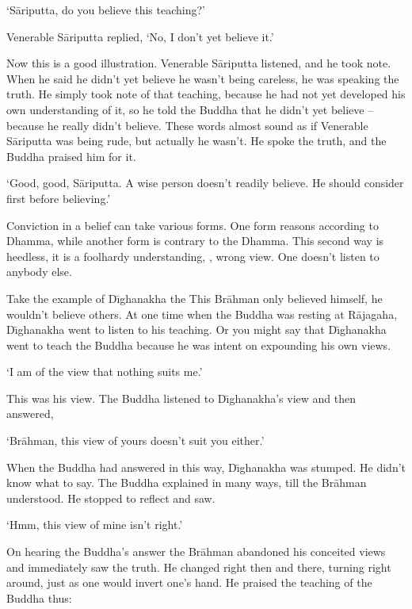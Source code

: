 `S\=ariputta, do you believe this teaching?' 

Venerable S\=ariputta replied, `No, I don't yet believe it.' 

Now this is a good illustration. Venerable S\=ariputta listened, and he took note. When he said he didn't yet believe he wasn't being careless, he was speaking the truth. He simply took note of that teaching, because he had not yet developed his own understanding of it, so he told the Buddha that he didn't yet believe -- because he really didn't believe. These words almost sound as if Venerable S\=ariputta was being rude, but actually he wasn't. He spoke the truth, and the Buddha praised him for it. 

`Good, good, S\=ariputta. A wise person doesn't readily believe. He should consider first before believing.' 

Conviction in a belief can take various forms. One form reasons according to Dhamma, while another form is contrary to the Dhamma. This second way is heedless, it is a foolhardy understanding, , wrong view. One doesn't listen to anybody else. 

Take the example of D\={\i}ghanakha the  This Br\=ahman only believed himself, he wouldn't believe others. At one time when the Buddha was resting at R\=ajagaha, D\={\i}ghanakha went to listen to his teaching. Or you might say that D\={\i}ghanakha went to teach the Buddha because he was intent on expounding his own views. 

`I am of the view that nothing suits me.' 

This was his view. The Buddha listened to D\={\i}ghanakha's view and then answered, 

`Br\=ahman, this view of yours doesn't suit you either.' 

When the Buddha had answered in this way, D\={\i}ghanakha was stumped. He didn't know what to say. The Buddha explained in many ways, till the Br\=ahman understood. He stopped to reflect and saw.

`Hmm, this view of mine isn't right.' 

On hearing the Buddha's answer the Br\=ahman abandoned his conceited views and immediately saw the truth. He changed right then and there, turning right around, just as one would invert one's hand. He praised the teaching of the Buddha thus: 

